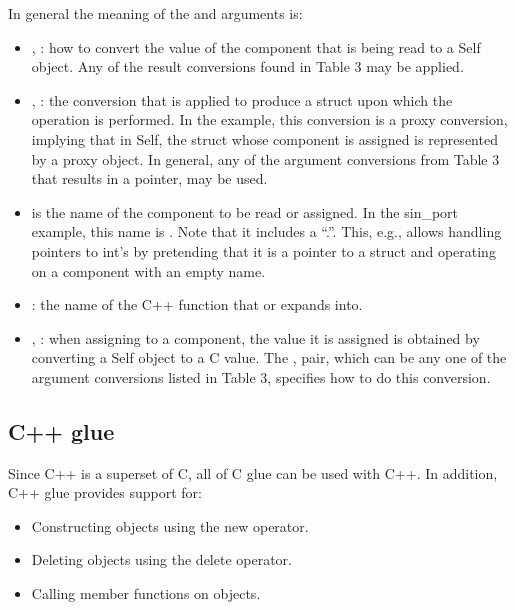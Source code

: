\documentclass[letterpaper,10pt,english]{sphinxmanual}
\begin{document}
In general the meaning of the  and  arguments is:
\begin{itemize}
\item {} 
, : how to convert the value of the component that is being read to a
Self object. Any of the result conversions found in Table 3 may be applied.

\item {} 
, : the conversion that is applied to produce a struct upon which the
operation is performed. In the  example, this conversion is a proxy conversion,
implying that in Self, the struct whose  component is assigned is represented by
a proxy object. In general, any of the argument conversions from Table 3 that results in a
pointer, may be used.

\item {} 
 is the name of the component to be read or assigned. In the sin\_port example, this
name is . Note that it includes a “.”. This, e.g., allows handling pointers to
int’s by pretending that it is a pointer to a struct and operating on a component with an
empty name.

\item {} 
: the name of the C++ function that  or  expands into.

\item {} 
, : when assigning to a component, the value it is assigned is obtained by
converting a Self object to a C value. The ,  pair, which can be any one
of the argument conversions listed in Table 3, specifies how to do this conversion.

\end{itemize}


\subsection{C++ glue}
\label{vmref:index-77}\label{vmref:id2}
Since C++ is a superset of C, all of C glue can be used with C++. In addition, C++ glue provides
support for:
\begin{itemize}
\item {} 
Constructing objects using the new operator.

\item {} 
Deleting objects using the delete operator.

\item {} 
Calling member functions on objects.

\end{itemize}
\end{document}
